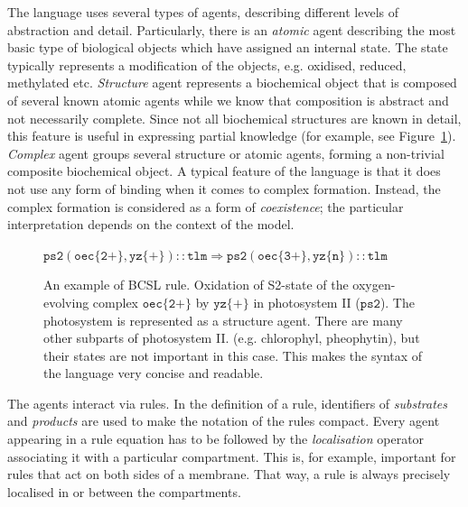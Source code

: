 \documentclass[11pt,a4paper]{report}
\begin{document}
The language uses several types of agents, describing different levels of abstraction and detail. Particularly, there is an \emph{atomic} agent describing the most basic type of biological objects which have assigned an internal state. The state typically represents a modification of the objects, e.g. oxidised, reduced, methylated etc. \emph{Structure} agent represents a biochemical object that is composed of several known atomic agents while we know that composition is abstract and not necessarily complete. Since not all biochemical structures are known in detail, this feature is useful in expressing partial knowledge (for example, see Figure~\ref{ps2_rule}). \emph{Complex} agent groups several structure or atomic agents, forming a non-trivial composite biochemical object. A typical feature of the language is that it does not use any form of binding when it comes to complex formation. Instead, the complex formation is considered as a form of \emph{coexistence}; the particular interpretation depends on the context of the model.

\begin{figure}[!h]
  \begin{center}
    $ \mathtt{ps2(oec\{2+\}, yz\{+\}){::}tlm \Rightarrow ps2(oec\{3+\}, yz\{n\}){::}tlm} $
  \end{center}
  \caption{An example of BCSL rule. Oxidation of S2-state of the oxygen-evolving complex $\mathtt{oec\{2+\}}$ by $\mathtt{yz\{+\}}$ in photosystem II ($\mathtt{ps2}$). The photosystem is represented as a structure agent. There are many other subparts of photosystem II. (e.g. chlorophyl, pheophytin), but their states are not important in this case. This makes the syntax of the language very concise and readable.}\label{ps2_rule}
\end{figure}

The agents interact via rules. In the definition of a rule, identifiers of \emph{substrates} and \emph{products} are used to make the notation of the rules compact. Every agent appearing in a rule equation has to be followed by the \emph{localisation} operator associating it with a particular compartment. This is, for example, important for rules that act on both sides of a membrane. That way, a rule is always precisely localised in or between the compartments.
\end{document}
